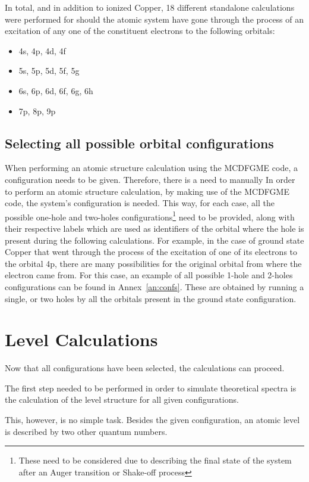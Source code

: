 In total, and in addition to ionized Copper, 18 different standalone calculations were performed for should the atomic system have gone through the process of an excitation of any one of the constituent electrons to the following orbitals:

\begin{itemize}
    \item 4s, 4p, 4d, 4f
    \item 5s, 5p, 5d, 5f, 5g
    \item 6s, 6p, 6d, 6f, 6g, 6h
    \item 7p, 8p, 9p
\end{itemize}


\subsection{Selecting all possible orbital configurations}
When performing an atomic structure calculation using the \gls{MCDFGME} code, a configuration needs to be given. Therefore, there is a need to manually
In order to perform an atomic structure calculation, by making use of the \gls{MCDFGME} code, the system's configuration is needed. This way, for each case, all the possible one-hole and two-holes configurations\footnote{These need to be considered due to describing the final state of the system after an Auger transition or Shake-off process} need to be provided, along with their respective labels which are used as identifiers of the orbital where the hole is present during the following calculations. For example, in the case of ground state Copper that went through the process of the excitation of one of its electrons to the orbital 4p, there are many possibilities for the original orbital from where the electron came from. For this case, an example of all possible 1-hole and 2-holes configurations can be found in Annex~\ref{an:confs}. These are obtained by running a single, or two holes by all the orbitals present in the ground state configuration.


\section{Level Calculations}
Now that all configurations have been selected, the calculations can proceed.

The first step needed to be performed in order to simulate theoretical spectra is the calculation of the level structure for all given configurations.

This, however, is no simple task. Besides the given configuration, an atomic level is described by two other quantum numbers.

